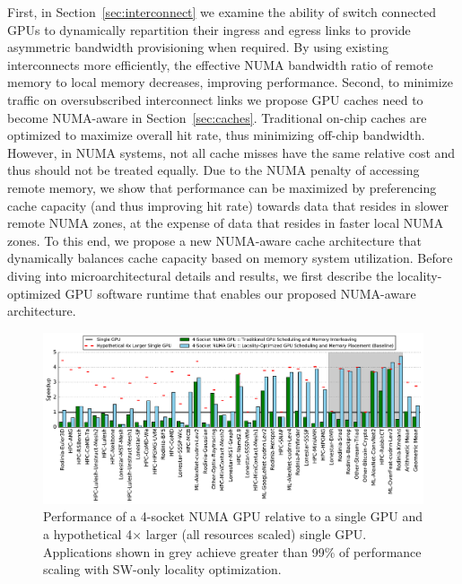 First, in Section~\ref{sec:interconnect} we examine the 
ability of switch connected GPUs to dynamically repartition their ingress and 
egress links to provide asymmetric bandwidth provisioning when required.  By 
using existing interconnects more efficiently, the effective NUMA bandwidth ratio 
of remote memory to local memory decreases, improving performance. Second, 
to minimize traffic on oversubscribed interconnect links we propose GPU caches need 
to become NUMA-aware in Section~\ref{sec:caches}. Traditional on-chip caches are 
optimized to maximize 
overall hit rate, thus minimizing off-chip bandwidth. However, in NUMA 
systems, not all cache misses have the same relative cost and thus should not 
be treated equally. Due to the NUMA penalty of accessing remote memory, we show 
that performance can be maximized by preferencing cache capacity (and thus 
improving hit rate) towards data that resides in slower remote NUMA zones, at the 
expense of data that resides in faster local NUMA zones. To this end, we propose 
a new NUMA-aware cache architecture that dynamically balances cache capacity based on 
memory system utilization. Before diving into microarchitectural details and results,
we first describe the locality-optimized GPU software runtime that enables our proposed
NUMA-aware architecture.

\begin{figure}[tp] 
    \centering
    \includegraphics[width=1.0\linewidth]{figures/plot_different_baselines.pdf}
    \caption{Performance of a 4-socket NUMA GPU relative to a single GPU 
and a hypothetical 4$\times$ larger (all resources scaled) single GPU.
Applications shown in grey 
achieve greater than 99\% of performance scaling with SW-only locality optimization.}
    \label{fig:motivation}
\end{figure}
